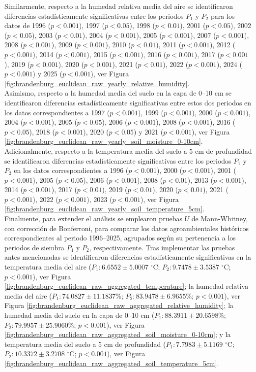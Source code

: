 Similarmente, respecto a la humedad relativa media del aire se identificaron diferencias estadísticamente significativas entre los periodos $P_1$ y $P_2$ para los datos de 1996 ($p<0.001$), 1997 ($p<0.05$), 1998 ($p<0.01$), 2001 ($p<0.05$), 2002 ($p<0.05$), 2003 ($p<0.01$), 2004 ($p<0.001$), 2005 ($p<0.001$), 2007 ($p<0.001$), 2008 ($p<0.001$), 2009 ($p<0.001$), 2010 ($p<0.01$), 2011 ($p<0.001$), 2012 ($p<0.001$), 2014 ($p<0.001$), 2015  ($p<0.001$), 2016 ($p<0.001$), 2017 ($p<0.001$), 2019 ($p<0.001$), 2020  ($p<0.001$), 2021 ($p<0.01$), 2022 ($p<0.001$), 2024 ($p<0.001$) y  2025  ($p<0.001$), ver Figura \ref{fig:brandenburg_euclidean_raw_yearly_relative_humidity}.\\

Asimismo, respecto a la humedad media del suelo en la capa de 0--10 cm se identificaron diferencias estadísticamente significativas entre estos dos periodos en los datos correspondientes a 1997 ($p<0.001$),
1999 ($p<0.001$), 2000 ($p<0.001$), 2004 ($p<0.001$), 2005 ($p<0.05$), 2006 ($p<0.001$), 2008 ($p<0.001$), 2016 ($p<0.05$), 2018  ($p<0.001$), 2020 ($p<0.05$) y 2021 ($p<0.001$), ver Figura \ref{fig:brandenburg_euclidean_raw_yearly_soil_moisture_0-10cm}.\\

Adicionalmente, respecto a la temperatura media del suelo a 5 cm de profundidad se identificaron diferencias estadísticamente significativas entre los periodos $P_1$ y $P_2$ en los datos correspondientes a 1996 ($p<0.001$), 2000 ($p<0.001$), 2001 ($p<0.001$), 2005 ($p<0.05$), 2006 ($p<0.001$), 2008 ($p<0.01$), 2013 ($p<0.001$), 2014 ($p<0.001$), 2017 ($p<0.01$), 2019 ($p<0.01$), 2020 ($p<0.01$), 2021 ($p<0.001$), 2022 ($p<0.001$), 2023 ($p<0.001$), ver Figura \ref{fig:brandenburg_euclidean_raw_yearly_soil_temperature_5cm}.\\

Finalmente, para extender el análisis se emplearon pruebas $U$ de Mann-Whitney, con corrección de Bonferroni, para comparar los datos agroambientales históricos correspondientes al periodo 1996--2025, agrupados según su pertenencia a los periodos de siembra $P_1$ y $P_2$, respectivamente.  Tras implementar las pruebas antes mencionadas se identificaron diferencias estadísticamente significativas en la temperatura media del aire ($P_1: 6.6552\pm5.0007$ $^\circ$C; $P_2: 9.7478\pm 3.5387$ $^\circ$C; $p<0.001$), ver Figura \ref{fig:brandenburg_euclidean_raw_aggregated_temperature}; la humedad relativa media del aire ($P_1: 74.0827\pm11.1837$\%; $P_2: 83.9478\pm6.9655$\%; $p<0.001$), ver Figura \ref{fig:brandenburg_euclidean_raw_aggregated_relative_humidity}; la humedad media del suelo en la capa de 0--10 cm  ($P_1: 88.3911\pm20.6598$\%; $P_2: 79.9957\pm25.9060$\%; $p<0.001$), ver Figura \ref{fig:brandenburg_euclidean_raw_aggregated_soil_moisture_0-10cm}; y la temperatura media del suelo a 5 cm de profundidad  ($P_1: 7.7983\pm5.1169$ $^\circ$C; $P_2:10.3372\pm 3.2708$ $^\circ$C; $p<0.001$), ver Figura \ref{fig:brandenburg_euclidean_raw_aggregated_soil_temperature_5cm}.\\

